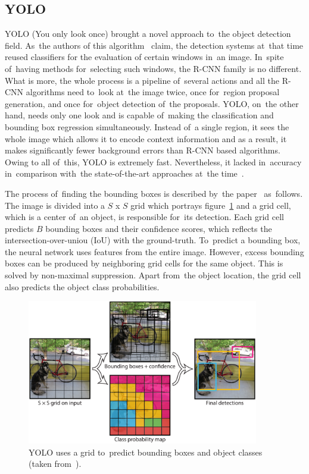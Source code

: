 \subsection{YOLO}
\label{algorithms-nn-yolo}
YOLO (You only look once) brought a novel approach to~the object detection field. As~the authors of this algorithm~\cite{yolo} claim, the detection systems at~that time reused classifiers for the evaluation of certain windows in~an image. In~spite of~having methods for~selecting such windows, the R-CNN family is no different. What is more, the whole process is a pipeline of~several actions and all the R-CNN algorithms need to~look at~the image twice, once for~region proposal generation, and once for~object detection of~the proposals. YOLO, on~the other hand, needs only one look and is capable of~making the classification and bounding box regression simultaneously. Instead of~a single region, it sees the whole image which allows it to encode context information and as a result, it makes significantly fewer background errors than R-CNN based algorithms. Owing to all of~this, YOLO is extremely fast. Nevertheless, it lacked in~accuracy in~comparison with~the state-of-the-art approaches at~the time~\cite{yolo}.

The process of~finding the bounding boxes is described by~the paper~\cite{yolo} as~follows. The image is divided into a \(S\) x \(S\) grid which portrays figure~\ref{algorithms-yolo-grid} and a grid cell, which is a center of~an object, is responsible for~its detection. Each grid cell predicts \(B\) bounding boxes and their confidence scores, which reflects the intersection-over-uniou (IoU) with the ground-truth. To~predict a bounding box, the neural network uses features from the entire image. However, excess bounding boxes can be produced by neighboring grid cells for the same object. This is solved by non-maximal suppression. Apart from~the object location, the grid cell also predicts the object class probabilities.

\begin{figure}[hbt]
    \centering
    \includegraphics[width=0.9\textwidth]{img/algorithms/yolo-grid.png}
    \caption{YOLO uses a grid to~predict bounding boxes and object classes (taken from~\cite{yolo}).}
    \label{algorithms-yolo-grid}
\end{figure}

